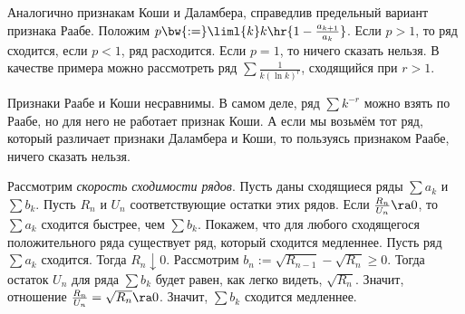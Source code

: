 \documentclass[a4paper]{article}
\begin{document}
Аналогично признакам Коши и Даламбера, справедлив предельный вариант признака Раабе. Положим $p\bw{:=}\liml{k} k\hr{ 1-\frac{a_{k+1}}{a_k}} $. Если $p > 1$, то
ряд сходится, если $p < 1$, ряд расходится. Если $p=1$, то ничего сказать нельзя. В качестве примера можно рассмотреть ряд $\sum \frac{1}{k(\ln k)^r}$,
сходящийся при $r > 1$.

\begin{note}
Признаки Раабе и Коши несравнимы. В самом деле, ряд $\sum k^{-r}$ можно взять по Раабе, но для него не работает признак Коши.
А если мы возьмём тот ряд, который различает признаки Даламбера и Коши, то пользуясь признаком Раабе, ничего сказать нельзя.
\end{note}

Рассмотрим \emph{скорость сходимости рядов}. Пусть даны сходящиеся ряды $\sum a_k$ и $\sum b_k$. Пусть $R_n$ и $U_n$\т
соответствующие остатки этих рядов. Если $\frac{R_n}{U_n} \ra 0$, то $\sum a_k$ сходится быстрее, чем $\sum b_k$.
Покажем, что для любого сходящегося положительного ряда существует ряд, который сходится медленнее. Пусть ряд
$\sum a_k$ сходится. Тогда $R_n \downarrow 0$. Рассмотрим $b_n := \sqrt{R_{n-1}} - \sqrt{R_n} \ge 0$. Тогда
остаток $U_n$ для ряда $\sum b_k$ будет равен, как легко видеть, $\sqrt{R_n}$.
Значит, отношение $\frac{R_n}{U_n}=\sqrt{R_n} \ra 0$. Значит, $\sum b_k$ сходится медленнее.
\end{document}
